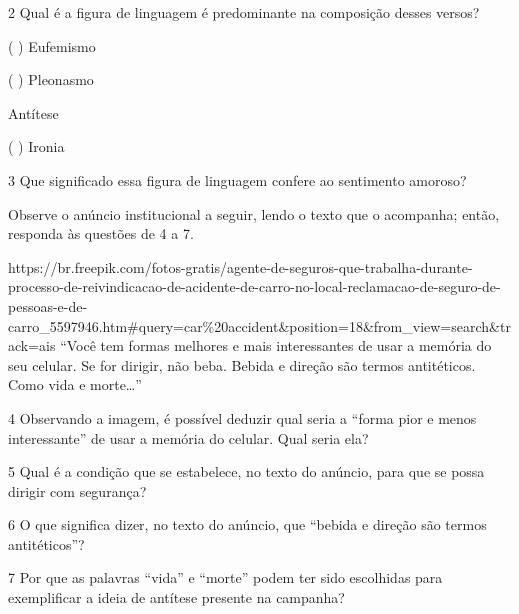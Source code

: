 \begin{itemize}
\begin{itemize}
{\begin{itemize}
\begin{itemize}
\num{2} Qual é a figura de linguagem é predominante na composição desses
versos?

( ) Eufemismo

( ) Pleonasmo

 Antítese

( ) Ironia

\num{3} Que significado essa figura de linguagem confere ao sentimento
amoroso? 

Observe o anúncio institucional a seguir, lendo o texto que o acompanha;
então, responda às questões de 4 a 7.

https://br.freepik.com/fotos-gratis/agente-de-seguros-que-trabalha-durante-processo-de-reivindicacao-de-acidente-de-carro-no-local-reclamacao-de-seguro-de-pessoas-e-de-carro\_5597946.htm\#query=car\%20accident\&position=18\&from\_view=search\&track=ais
``Você tem formas melhores e mais interessantes de usar a memória do seu
celular. Se for dirigir, não beba. Bebida e direção são termos
antitéticos. Como vida e morte\ldots{}''

\num{4} Observando a imagem, é possível deduzir qual seria a ``forma
pior e menos interessante'' de usar a memória do celular. Qual seria
ela? 

\num{5} Qual é a condição que se estabelece, no texto do anúncio, para
que se possa dirigir com segurança? 

\num{6} O que significa dizer, no texto do anúncio, que ``bebida e
direção são termos antitéticos''? 


\num{7} Por que as palavras ``vida'' e ``morte'' podem ter sido
escolhidas para exemplificar a ideia de antítese presente na campanha?


\end{itemize}
\end{itemize}}
\end{itemize}
\end{itemize}

